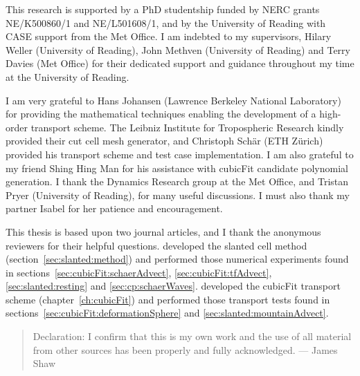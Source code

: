 \null\vfil
\begin{acknowledgements}
This research is supported by a PhD studentship funded by NERC grants NE/K500860/1 and NE/L501608/1, and by the University of Reading with CASE support from the Met Office.  I am indebted to my supervisors, Hilary Weller (University of Reading), John Methven (University of Reading) and Terry Davies (Met Office) for their dedicated support and guidance throughout my time at the University of Reading.

I am very grateful to Hans Johansen (Lawrence Berkeley National Laboratory) for providing the mathematical techniques enabling the development of a high-order transport scheme.  The Leibniz Institute for Tropospheric Research kindly provided their cut cell mesh generator, and Christoph Sch\"{a}r (ETH Z\"{u}rich) provided his transport scheme and test case implementation.
I am also grateful to my friend Shing Hing Man for his assistance with cubicFit candidate polynomial generation.  I thank the Dynamics Research group at the Met Office, and Tristan Pryer (University of Reading), for many useful discussions.
I must also thank my partner Isabel for her patience and encouragement.
	
This thesis is based upon two journal articles, and I thank the anonymous reviewers for their helpful questions. \citet{shaw-weller2016} developed the slanted cell method (section~\ref{sec:slanted:method}) and performed those numerical experiments found in sections~\ref{sec:cubicFit:schaerAdvect}, \ref{sec:cubicFit:tfAdvect}, \ref{sec:slanted:resting} and \ref{sec:cp:schaerWaves}.
\citet{shaw2017} developed the cubicFit transport scheme (chapter~\ref{ch:cubicFit}) and performed those transport tests found in sections~\ref{sec:cubicFit:deformationSphere} and \ref{sec:slanted:mountainAdvect}.

\vspace*{4em}


\end{acknowledgements}
\vfil
\begin{quote}{\small Declaration: I confirm that this is my own work and the use of all material from other sources has been properly and fully acknowledged. --- James Shaw}
\end{quote}

